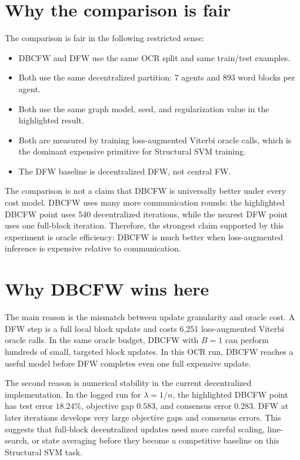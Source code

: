 \documentclass[11pt,a4paper]{article}
\begin{document}
\section{Why the comparison is fair}

The comparison is fair in the following restricted sense:
\begin{itemize}
  \item DBCFW and DFW use the same OCR split and same train/test examples.
  \item Both use the same decentralized partition: 7 agents and 893 word blocks per agent.
  \item Both use the same graph model, seed, and regularization value in the highlighted result.
  \item Both are measured by training loss-augmented Viterbi oracle calls, which is the dominant expensive primitive for Structural SVM training.
  \item The DFW baseline is decentralized DFW, not central FW.
\end{itemize}

The comparison is not a claim that DBCFW is universally better under every cost model. DBCFW uses many more communication rounds: the highlighted DBCFW point uses 540 decentralized iterations, while the nearest DFW point uses one full-block iteration. Therefore, the strongest claim supported by this experiment is oracle efficiency: DBCFW is much better when loss-augmented inference is expensive relative to communication.

\section{Why DBCFW wins here}

The main reason is the mismatch between update granularity and oracle cost. A DFW step is a full local block update and costs 6,251 loss-augmented Viterbi oracle calls. In the same oracle budget, DBCFW with \(B=1\) can perform hundreds of small, targeted block updates. In this OCR run, DBCFW reaches a useful model before DFW completes even one full expensive update.

The second reason is numerical stability in the current decentralized implementation. In the logged run for \(\lambda=1/n\), the highlighted DBCFW point has test error \(18.24\%\), objective gap \(0.583\), and consensus error \(0.283\). DFW at later iterations develops very large objective gaps and consensus errors. This suggests that full-block decentralized updates need more careful scaling, line-search, or state averaging before they become a competitive baseline on this Structural SVM task.
\end{document}

